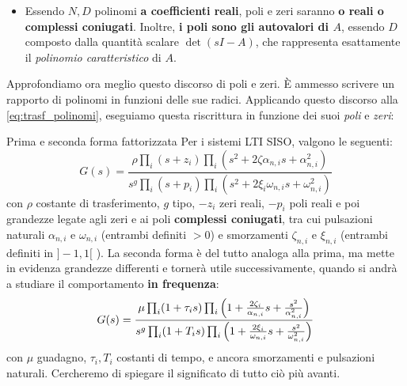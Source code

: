 \begin{itemize}
\item Essendo $N,D$ polinomi \textbf{a coefficienti reali}, poli e zeri saranno \textbf{o reali o complessi coniugati}. Inoltre, \textbf{i poli sono gli autovalori di $A$}, essendo $D$   composto dalla quantità scalare $\det(sI-A)$, che rappresenta esattamente il \textit{polinomio caratteristico} di $A$.
\end{itemize}
\bb
Approfondiamo ora meglio questo discorso di poli e zeri. È ammesso scrivere un rapporto di polinomi in funzioni delle sue radici. Applicando questo discorso 
alla \eqref{eq:trasf_polinomi}, eseguiamo questa riscrittura in funzione dei suoi \textit{poli} e  \textit{zeri}:

\begin{defin}{Prima e seconda forma fattorizzata}{}
Per i sistemi LTI SISO, valgono le seguenti:
\begin{equation}
\label{eq:prima_fatt}
G(s) = \frac{\rho \prod_i (s+z_i)\prod_i (s^2+2\zeta \alpha_{n,i}s+\alpha^2_{n,i})}{s^g \prod_i(s+p_i) \prod_i(s^2+2\xi_i \omega_{n,i}s + \omega^2_{n,i})}
\end{equation}
con $\rho$ costante di trasferimento, $g$ tipo, $-z_i$ zeri reali, $-p_i$ poli reali e poi grandezze legate agli zeri e ai poli \textbf{complessi coniugati}, tra cui pulsazioni naturali $\alpha_{n,i}$ e $\omega_{n,i}$ (entrambi definiti $>0$) e smorzamenti $\zeta_{n,i}$ e $\xi_{n,i}$ (entrambi definiti in $]-1,1[$ ).
\bb
La seconda forma è del tutto analoga alla prima, ma mette in evidenza grandezze differenti e tornerà utile successivamente, quando si andrà a studiare il comportamento \textbf{in frequenza}:
\begin{equation}
\label{eq:sec_fatt}
G(s) = \frac{\mu\prod_i (1+\tau_i s) \prod_i \left( 1+\frac{2\zeta_i}{\alpha_{n,i}}s + \frac{s^2}{\alpha^2_{n,i}} \right)}{s^g \prod_i (1+T_i s)\prod_i \left( 1 + \frac{2\xi_i}{\omega_{n,i}}s + \frac{s^2}{\omega^2_{n,i}} \right)}
\end{equation}
con $\mu$ guadagno, $\tau_i, T_i$ costanti di tempo, e ancora smorzamenti e pulsazioni naturali. Cercheremo di spiegare il significato di tutto ciò più avanti.
\end{defin}

